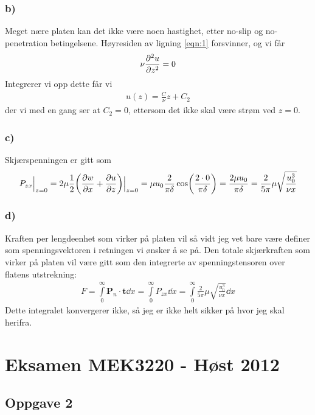\documentclass[12p,a4paper]{article}
\renewcommand{\b}{\boldsymbol}
\newcommand{\half}{\frac{1}{2}}
\begin{document}
\subsubsection*{b)}
Meget nære platen kan det ikke være noen hastighet, etter no-slip og no-penetration betingelsene. Høyresiden av ligning \ref{eqn:1} forsvinner, og vi får
\begin{align*}
    \nu\pdv[2]{u}{z} = 0
\end{align*}
Integrerer vi opp dette får vi
\begin{align*}
    u(z) = \frac{C}{\nu}z + C_2
\end{align*}
der vi med en gang ser at $C_2 = 0$, ettersom det ikke skal være strøm ved $z=0$.


\subsubsection*{c)}
Skjærspenningen er gitt som
\begin{align*}
    P_{zx}\Big|_{z=0} = 2\mu\half\qty(\pdv{w}{x} + \pdv{u}{z})\Big|_{z=0} = \mu u_0\frac{2}{\pi\delta}\cos(\frac{2\cdot 0}{\pi\delta}) = \frac{2\mu u_0}{\pi\delta} = \frac{2}{5\pi}\mu\sqrt{\frac{u_0^3}{\nu x}}
\end{align*}


\subsubsection*{d)}
Kraften per lengdeenhet som virker på platen vil så vidt jeg vet bare være definer som spenningsvektoren i retningen vi ønsker å se på.
Den totale skjærkraften som virker på platen vil være gitt som den integrerte av spenningstensoren over flatens utstrekning:
\begin{align*}
    F = \int\limits_0^{\infty} \b P_n \cdot \b t \dd{x} = \int\limits_0^\infty P_{zx} \dd{x} = \int\limits_0^{\infty} \frac{2}{5\pi}\mu\sqrt{\frac{u_0^3}{\nu x}} \dd{x}
\end{align*}
Dette integralet konvergerer ikke, så jeg er ikke helt sikker på hvor jeg skal herifra.



\section*{Eksamen MEK3220 - Høst 2012}
\subsection*{Oppgave 2}
\end{document}
